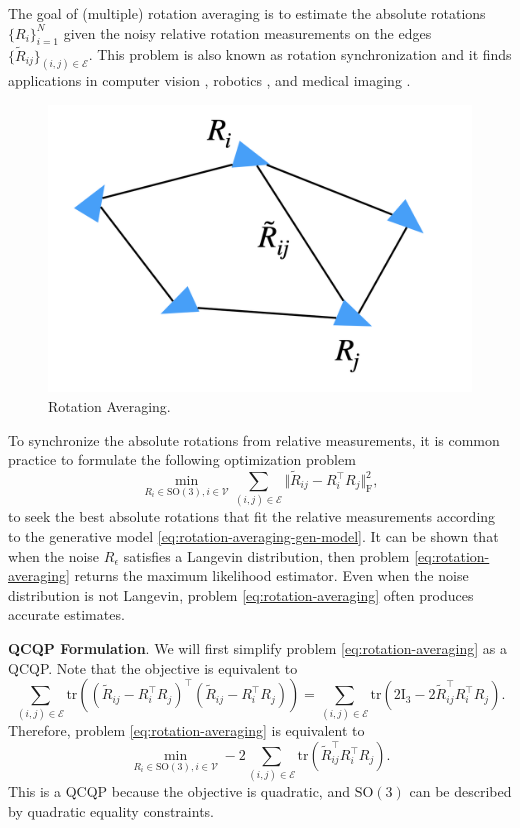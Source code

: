 \documentclass[
]{book}
\theoremstyle{definition}
\theoremstyle{definition}
\theoremstyle{definition}
\theoremstyle{definition}
\theoremstyle{remark}
\begin{document}
The goal of (multiple) rotation averaging is to estimate the absolute rotations \(\{R_i \}_{i=1}^N\) given the noisy relative rotation measurements on the edges \(\{\tilde{R}_{ij} \}_{(i,j) \in \mathcal{E}}\). This problem is also known as rotation synchronization and it finds applications in computer vision \citep{eriksson18cvpr-rotation}, robotics \citep{rosen19ijrr-sesync}, and medical imaging \citep{wang13ima-exact}.

\begin{figure}

{\centering \includegraphics[width=0.6\linewidth]{images/rotation_avg} 

}

\caption{Rotation Averaging.}\label{fig:RotationAveraging}
\end{figure}

To synchronize the absolute rotations from relative measurements, it is common practice to formulate the following optimization problem
\begin{equation}
\min_{R_i \in \mathrm{SO}(3), i\in \mathcal{V}} \sum_{(i,j) \in \mathcal{E}} \Vert \tilde{R}_{ij} - R_i^\top R_j \Vert_\mathrm{F}^2,
\label{eq:rotation-averaging}
\end{equation}
to seek the best absolute rotations that fit the relative measurements according to the generative model \eqref{eq:rotation-averaging-gen-model}. It can be shown that when the noise \(R_\epsilon\) satisfies a Langevin distribution, then problem \eqref{eq:rotation-averaging} returns the maximum likelihood estimator. Even when the noise distribution is not Langevin, problem \eqref{eq:rotation-averaging} often produces accurate estimates.

\textbf{QCQP Formulation}. We will first simplify problem \eqref{eq:rotation-averaging} as a QCQP. Note that the objective is equivalent to
\[
\sum_{(i,j) \in \mathcal{E}} \mathrm{tr}\left( (\tilde{R}_{ij} - R_i^\top R_j)^\top(\tilde{R}_{ij} - R_i^\top R_j) \right) = \sum_{(i,j) \in \mathcal{E}} \mathrm{tr}\left( 2 \mathrm{I}_3 - 2 \tilde{R}_{ij}^\top R_i^\top R_j \right).
\]
Therefore, problem \eqref{eq:rotation-averaging} is equivalent to
\begin{equation}
\min_{R_i \in \mathrm{SO}(3), i\in\mathcal{V}} -2\sum_{(i,j)\in\mathcal{E}} \mathrm{tr}(\tilde{R}_{ij}^\top R_i^\top R_j).
\label{eq:rotation-averaging-qcqp}
\end{equation}
This is a QCQP because the objective is quadratic, and \(\mathrm{SO}(3)\) can be described by quadratic equality constraints.
\end{document}
